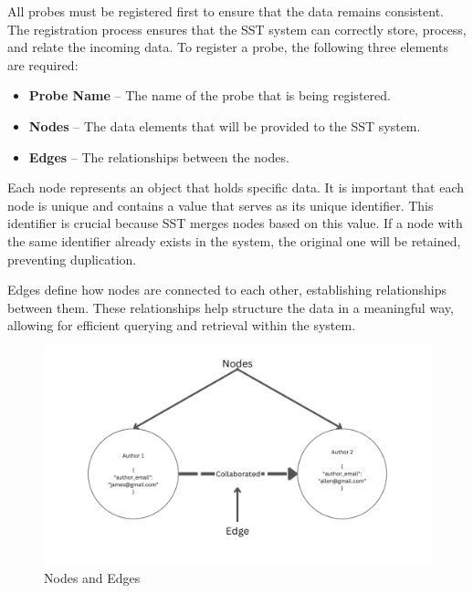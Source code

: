 All probes must be registered first to ensure that the data remains consistent. The registration process ensures that the SST system can correctly store, process, and relate the incoming data. To register a probe, the following three elements are required:

\begin{itemize}
    \item \textbf{Probe Name} – The name of the probe that is being registered.
    \item \textbf{Nodes} – The data elements that will be provided to the SST system.
    \item \textbf{Edges} – The relationships between the nodes.
\end{itemize}

Each node represents an object that holds specific data. It is important that each node is unique and contains a value that serves as its unique identifier. This identifier is crucial because SST merges nodes based on this value. If a node with the same identifier already exists in the system, the original one will be retained, preventing duplication.

Edges define how nodes are connected to each other, establishing relationships between them. These relationships help structure the data in a meaningful way, allowing for efficient querying and retrieval within the system.

\begin{figure}[H]
    \centering
    \includegraphics[width=1\textwidth]{figures/nodes_and_edges.png}
    \caption{Nodes and Edges}
    \label{fig:nodes_and_edges}
\end{figure}

